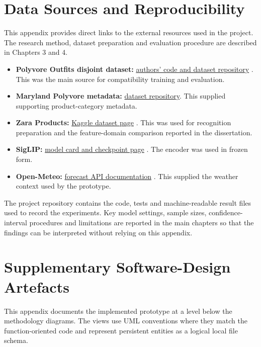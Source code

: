 \chapter{Data Sources and Reproducibility}
\label{app:reproducibility}

This appendix provides direct links to the external resources used in the
project. The research method, dataset preparation and evaluation procedure are
described in Chapters 3 and 4.

\begin{itemize}
  \item \textbf{Polyvore Outfits disjoint dataset:}
  \href{https://github.com/mvasil/fashion-compatibility}{authors' code and dataset repository}
  \parencite{vasileva2018repository}. This was the main source for compatibility
  training and evaluation.
  \item \textbf{Maryland Polyvore metadata:}
  \href{https://github.com/xthan/polyvore-dataset}{dataset repository}. This
  supplied supporting product-category metadata.
  \item \textbf{Zara Products:}
  \href{https://www.kaggle.com/datasets/maparla/zara-products}{Kaggle dataset page}
  \parencite{parrenolara2024zara}. This was used for recognition preparation
  and the feature-domain comparison reported in the dissertation.
  \item \textbf{SigLIP:}
  \href{https://huggingface.co/google/siglip-base-patch16-224}{model card and checkpoint page}
  \parencite{google2024siglipmodelcard}. The encoder was used in frozen form.
  \item \textbf{Open-Meteo:}
  \href{https://open-meteo.com/en/docs}{forecast API documentation}
  \parencite{openmeteo2026}. This supplied the weather context used by the
  prototype.
\end{itemize}

The project repository contains the code, tests and machine-readable result
files used to record the experiments. Key model settings, sample sizes,
confidence-interval procedures and limitations are reported in the main
chapters so that the findings can be interpreted without relying on this
appendix.

\chapter{Supplementary Software-Design Artefacts}
\label{app:software-design}

This appendix documents the implemented prototype at a level below the
methodology diagrams. The views use UML conventions where they match the
function-oriented code and represent persistent entities as a logical local
file schema.

